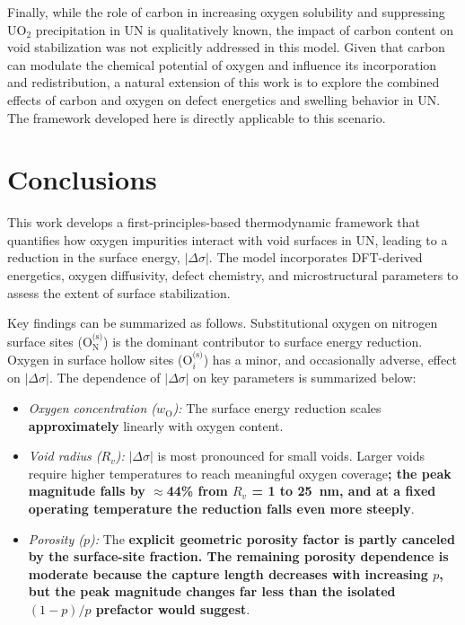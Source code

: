 \documentclass[preprint,12pt,sort&compress]{elsarticle}
\newcommand{\?}{\stackrel{?}{=}}
\providecommand{\DIFaddtex}[1]{{\bf #1}} %
\providecommand{\DIFdeltex}[1]{} %
\providecommand{\DIFaddbegin}{\protect\color{blue}} %
\providecommand{\DIFaddend}{\protect\color{black}} %
\providecommand{\DIFdelbegin}{\protect\color{red}} %
\providecommand{\DIFdelend}{\protect\color{black}} %
\providecommand{\DIFadd}[1]{\texorpdfstring{\DIFaddtex{#1}}{#1}} %
\providecommand{\DIFdel}[1]{\texorpdfstring{\DIFdeltex{#1}}{}} %
\begin{document}
Finally, while the role of carbon in increasing oxygen solubility and suppressing UO$_2$ precipitation in UN is qualitatively known, the impact of carbon content on void stabilization was not explicitly addressed in this model. Given that carbon can modulate the chemical potential of oxygen and influence its incorporation and redistribution, a natural extension of this work is to explore the combined effects of carbon and oxygen on defect energetics and swelling behavior in UN. The framework developed here is directly applicable to this scenario.

\section{Conclusions}

This work develops a first-principles-based thermodynamic framework that quantifies how oxygen impurities interact with void surfaces in UN, leading to a reduction in the surface energy, $|\Delta \sigma|$. The model incorporates DFT-derived energetics, oxygen diffusivity, defect chemistry, and microstructural parameters to assess the extent of surface stabilization.

Key findings can be summarized as follows. Substitutional oxygen on nitrogen surface sites ($\text{O}_\text{N}^\text{(s)}$) is the dominant contributor to surface energy reduction. Oxygen in surface hollow sites ($\text{O}_i^\text{(s)}$) has a minor, and occasionally adverse, effect on $|\Delta \sigma|$. The dependence of $|\Delta \sigma|$ on key parameters is summarized below:
\begin{itemize}
    \item \textit{Oxygen concentration ($w_\text{O}$):} The surface energy reduction scales \DIFaddbegin \DIFadd{approximately }\DIFaddend linearly with oxygen content.
    \item \textit{Void radius ($R_v$):} $|\Delta \sigma|$ is most pronounced for small voids. Larger voids require higher temperatures to reach meaningful oxygen coverage\DIFdelbegin \DIFdel{and experience a slightly smaller $|\Delta \sigma|$}\DIFdelend \DIFaddbegin \DIFadd{; the peak magnitude falls by $\approx$44\% from $R_v$ = 1 to 25~nm, and at a fixed operating temperature the reduction falls even more steeply}\DIFaddend .
    \item \textit{Porosity ($p$):} The \DIFdelbegin \DIFdel{surface energy reduction is found to be weakly dependent on porosity }\DIFdelend \DIFaddbegin \DIFadd{explicit geometric porosity factor is partly canceled by the surface-site fraction. The remaining porosity dependence is moderate because the capture length decreases with increasing $p$, but the peak magnitude changes far less than the isolated $(1-p)/p$ prefactor would suggest}\DIFaddend .
    \end{itemize}
\end{document}
